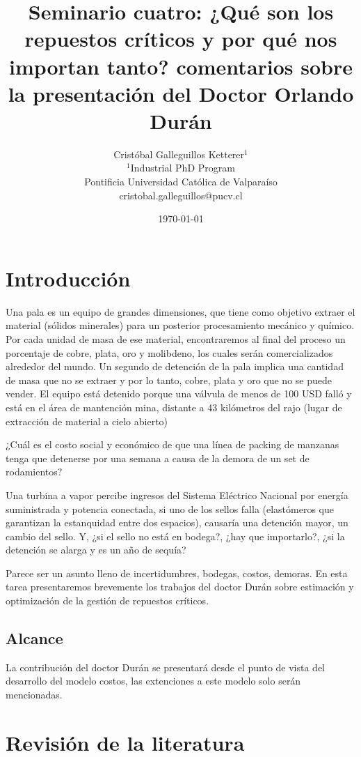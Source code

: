 \documentclass{article}
\title{Seminario cuatro: ¿Qué son los repuestos críticos y por qué nos importan tanto? comentarios sobre la presentación del Doctor Orlando Durán}
\author{Cristóbal Galleguillos Ketterer$^{1}$\\
\small{$^{1}$Industrial PhD Program}\\
\small{Pontificia Universidad Católica de Valparaíso}\\
\small{cristobal.galleguillos@pucv.cl}
}
\date{\small{\today}}
\begin{document}
\maketitle

\section{Introducción}

Una pala es un equipo de grandes dimensiones, que tiene como objetivo extraer el material (sólidos minerales) para un posterior procesamiento mecánico y químico. Por cada unidad de masa de ese material, encontraremos al final del proceso un porcentaje de cobre, plata, oro y molibdeno, los cuales serán comercializados alrededor del mundo.  Un segundo de detención de la pala implica una cantidad de masa que no se extraer y por lo tanto, cobre, plata y oro que no se puede vender. El equipo está detenido porque una válvula de menos de 100 USD falló y está en el área de mantención mina, distante a 43 kilómetros del rajo (lugar de extracción de material a cielo abierto)

¿Cuál es el costo social y económico de que una línea de packing de manzanas tenga que detenerse por una semana a causa de la demora de un set de rodamientos?

Una turbina a vapor percibe ingresos del Sistema Eléctrico Nacional por energía suministrada y potencia conectada, si uno de los sellos falla (elastómeros que garantizan la estanquidad entre dos espacios), causaría una detención mayor, un cambio del sello. Y, ¿si el sello no está en bodega?, ¿hay que importarlo?, ¿si la detención se alarga y es un año de sequía?

Parece ser un asunto lleno de incertidumbres, bodegas, costos, demoras. En esta tarea presentaremos brevemente los trabajos del doctor Durán sobre estimación y optimización de la gestión de repuestos críticos.



\subsection{Alcance}

La contribución del doctor Durán se presentará desde el punto de vista del desarrollo del modelo costos, las extenciones a este modelo solo serán mencionadas.

\section{Revisión de la literatura}
\end{document}
